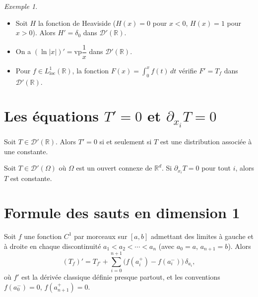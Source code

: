 \documentclass[12pt,a4paper,openany]{book}
\theoremstyle{definition}
\theoremstyle{plain}
\theoremstyle{remark}
\newtheorem*{example}{Exemple}
\newenvironment{exemple}{\begin{example}}{\end{example}}
\begin{document}
	\begin{exemple}
		\begin{itemize}
			\item Soit $H$ la fonction de Heaviside ($H(x) = 0$ pour $x < 0$, $H(x) = 1$ pour $x > 0$). Alors $H' = \delta_0$ dans $\mathcal{D}'(\mathbb{R})$.
			\item On a $(\ln|x|)' = \mathrm{vp}\dfrac{1}{x}$ dans $\mathcal{D}'(\mathbb{R})$.
			\item Pour $f \in L^1_{\mathrm{loc}}(\mathbb{R})$, la fonction $F(x) = \int_0^x f(t)\,dt$ vérifie $F' = T_f$ dans $\mathcal{D}'(\mathbb{R})$.
		\end{itemize}
	\end{exemple}
	
	\section{Les équations \texorpdfstring{$T'=0$}{T'=0} et \texorpdfstring{$\partial_{x_i} T = 0$}{dxi T = 0}}
	
	\begin{proposition}
		Soit $T \in \mathcal{D}'(\mathbb{R})$. Alors $T' = 0$ si et seulement si $T$ est une distribution associée à une constante.
	\end{proposition}
	
	\begin{corollary}
		Soit $T \in \mathcal{D}'(\Omega)$ où $\Omega$ est un ouvert connexe de $\mathbb{R}^d$. Si $\partial_{x_i} T = 0$ pour tout $i$, alors $T$ est constante.
	\end{corollary}
	
	\section{Formule des sauts en dimension 1}
	
	\begin{theorem}
		Soit $f$ une fonction $C^1$ par morceaux sur $[a,b]$ admettant des limites à gauche et à droite en chaque discontinuité $a_1 < a_2 < \cdots < a_n$ (avec $a_0 = a$, $a_{n+1} = b$). Alors
		\[
		(T_f)' = T_{f'} + \sum_{i=0}^{n+1} \bigl(f(a_i^+) - f(a_i^-)\bigr)\,\delta_{a_i},
		\]
		où $f' $ est la dérivée classique définie presque partout, et les conventions $f(a_0^-) = 0$, $f(a_{n+1}^+) = 0$.
	\end{theorem}
	
\end{document}

